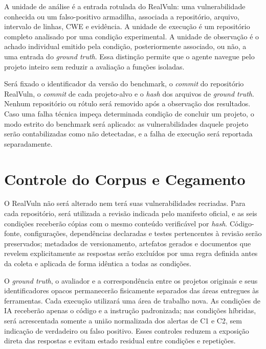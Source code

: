A unidade de análise é a entrada rotulada do RealVuln: uma vulnerabilidade conhecida ou um falso-positivo armadilha, associada a repositório, arquivo, intervalo de linhas, CWE e evidência. A unidade de execução é um repositório completo analisado por uma condição experimental. A unidade de observação é o achado individual emitido pela condição, posteriormente associado, ou não, a uma entrada do \textit{ground truth}. Essa distinção permite que o agente navegue pelo projeto inteiro sem reduzir a avaliação a funções isoladas.

Será fixado o identificador da versão do benchmark, o \textit{commit} do repositório RealVuln, o \textit{commit} de cada projeto-alvo e o \textit{hash} dos arquivos de \textit{ground truth}. Nenhum repositório ou rótulo será removido após a observação dos resultados. Caso uma falha técnica impeça determinada condição de concluir um projeto, o modo estrito do benchmark será aplicado: as vulnerabilidades daquele projeto serão contabilizadas como não detectadas, e a falha de execução será reportada separadamente.

\section{Controle do Corpus e Cegamento}\label{sec:repositorio-experimental}

O RealVuln não será alterado nem terá suas vulnerabilidades recriadas. Para cada repositório, será utilizada a revisão indicada pelo manifesto oficial, e as seis condições receberão cópias com o mesmo conteúdo verificável por \textit{hash}. Código-fonte, configurações, dependências declaradas e testes pertencentes à revisão serão preservados; metadados de versionamento, artefatos gerados e documentos que revelem explicitamente as respostas serão excluídos por uma regra definida antes da coleta e aplicada de forma idêntica a todas as condições.

O \textit{ground truth}, o avaliador e a correspondência entre os projetos originais e seus identificadores opacos permanecerão fisicamente separados das áreas entregues às ferramentas. Cada execução utilizará uma área de trabalho nova. As condições de IA receberão apenas o código e a instrução padronizada; nas condições híbridas, será acrescentada somente a união normalizada dos alertas de C1 e C2, sem indicação de verdadeiro ou falso positivo. Esses controles reduzem a exposição direta das respostas e evitam estado residual entre condições e repetições.

